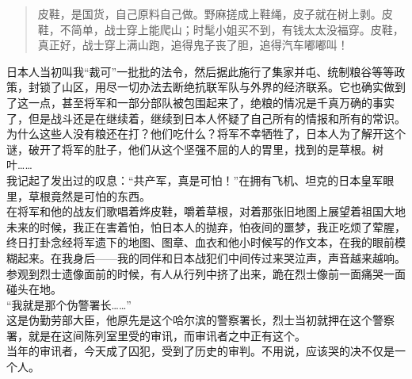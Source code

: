 \begin{quote}
	皮鞋，是国货，自己原料自己做。野麻搓成上鞋绳，皮子就在树上剥。皮鞋，不简单，战士穿上能爬山；时髦小姐买不到，有钱太太没福穿。皮鞋，真正好，战士穿上满山跑，追得鬼子丧了胆，追得汽车嘟嘟叫！\\
\end{quote}

日本人当初叫我“裁可”一批批的法令，然后据此施行了集家并屯、统制粮谷等等政策，封锁了山区，用尽一切办法去断绝抗联军队与外界的经济联系。它也确实做到了这一点，甚至将军和一部分部队被包围起来了，绝粮的情况是千真万确的事实了，但是战斗还是在继续着，继续到日本人怀疑了自己所有的情报和所有的常识。为什么这些人没有粮还在打？他们吃什么？将军不幸牺牲了，日本人为了解开这个谜，破开了将军的肚子，他们从这个坚强不屈的人的胃里，找到的是草根。树叶……\\

我记起了发出过的叹息：“共产军，真是可怕！”在拥有飞机、坦克的日本皇军眼里，草根竟然是可怕的东西。\\

在将军和他的战友们歌唱着烨皮鞋，嚼着草根，对着那张旧地图上展望着祖国大地未来的时候，我正在害着怕，怕日本人的抛弃，怕夜间的噩梦，我正吃烦了荤腥，终日打卦念经将军遗下的地图、图章、血衣和他小时候写的作文本，在我的眼前模糊起来。在我身后——我的同伴和日本战犯们中间传过来哭泣声，声音越来越响。参观到烈士遗像面前的时候，有人从行列中挤了出来，跪在烈士像前一面痛哭一面碰头在地。\\

“我就是那个伪警署长……”\\

这是伪勤劳部大臣，他原先是这个哈尔滨的警察署长，烈士当初就押在这个警察署，就是在这间陈列室里受的审讯，而审讯者之中正有这个。\\

当年的审讯者，今天成了囚犯，受到了历史的审判。不用说，应该哭的决不仅是一个人。
